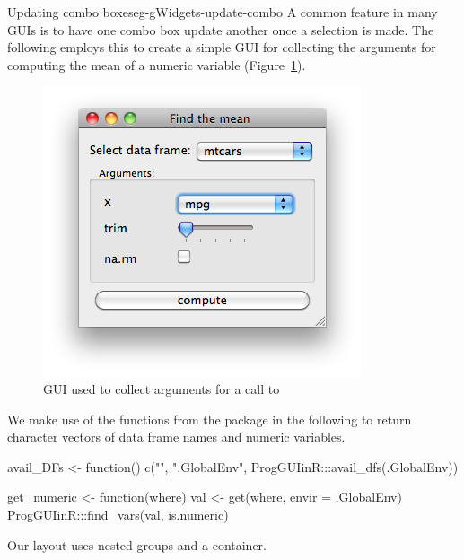 \begin{example}{Updating combo boxes}{eg-gWidgets-update-combo}
  A common feature in many GUIs is to have one combo box update
  another once a selection is made. The following employs this to
  create a simple GUI for collecting the arguments for computing the mean of a numeric variable
  (Figure~\ref{fig:gWidgets-mean-default}).
  
  \begin{figure}
    \centering
    \includegraphics[width=.4\textwidth]{fig-gWidgets-mean-default.png}
    \caption{GUI used to collect arguments for a call to
      }
    \label{fig:gWidgets-mean-default}
  \end{figure}
  
  We  make use of the functions from the  package
  in the following to return character vectors of data frame names and
  numeric variables.

\begin{Schunk}
\begin{Sinput}
 avail_DFs <- function() {
   c("", ".GlobalEnv", ProgGUIinR:::avail_dfs(.GlobalEnv))
 }
\end{Sinput}
\end{Schunk}
\begin{Schunk}
\begin{Sinput}
 get_numeric <- function(where) {
   val <- get(where, envir = .GlobalEnv)
   ProgGUIinR:::find_vars(val, is.numeric)
 }
\end{Sinput}
\end{Schunk}

Our layout uses nested groups and a  container.
\begin{Schunk}
\end{Schunk}


\end{example}
